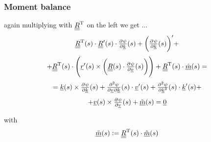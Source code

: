 \begin{frame}
  \frametitle{Moment balance}
  again multiplying with $\underline{\underline{R}}^{\mathrm{T}}$ on the left we get ...
  \begin{displaymath}
    \doubleunderline{R}^{\mathrm{T}}(s) \cdot
    \doubleunderline{R}^{\prime}(s) \cdot \pd{\psi}{\underline{k}}(s) +
    \biggl( \pd{\psi}{\underline{k}}(s) \biggr)^{\prime} +
  \end{displaymath}
  \begin{displaymath}
    + \doubleunderline{R}^{\mathrm{T}}(s) \cdot \Biggl(
    \underline{r}^{\prime}(s) \times \biggl( \doubleunderline{R}(s) \cdot \pd{\psi}{\underline{v}}(s) \biggr) \Biggr) +
    \doubleunderline{R}^{\mathrm{T}}(s) \cdot
    \underline{\hat{m}}(s) =
  \end{displaymath}
  \begin{displaymath}
    = \underline{k}(s) \times \pd{\psi}{\underline{k}}(s) +
    \md{\psi}{2}{\underline{v}}{}{\underline{k}}{}(s) \cdot \underline{v}^{\prime}(s) +
    \pd[2]{\psi}{\underline{k}}(s) \cdot \underline{k}^{\prime}(s) +
  \end{displaymath}
  \begin{displaymath}
    + \underline{v}(s) \times \pd{\psi}{\underline{v}}(s) +
    \underline{\tilde{m}}(s) =
    \underline{0}
  \end{displaymath}
  
  with
  \begin{displaymath}
    \underline{\tilde{m}}(s) :=
    \underline{\underline{R}}^{\mathrm{T}}(s) \cdot \underline{\hat{m}}(s)
  \end{displaymath}
\end{frame}


